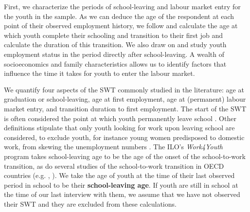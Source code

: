 \documentclass[
  a4paper, twoside, 12pt]{book}
\begin{document}
First, we characterize the periods of school-leaving and labour market entry for the youth in the sample. As we can deduce the age of the respondent at each point of their observed employment history, we follow \textcite{manacorda2017} and calculate the age at which youth complete their schooling and transition to their first job and calculate the duration of this transition. We also draw on \textcite{bridges2017} and study youth employment status in the period directly after school-leaving. A wealth of socioeconomics and family characteristics allows us to identify factors that influence the time it takes for youth to enter the labour market.

We quantify four aspects of the SWT commonly studied in the literature: age at graduation or school-leaving, age at first employment, age at (permanent) labour market entry, and transition duration to first employment. The start of the SWT is often considered the point at which youth permanently leave school \autocite{bowers1998,nilsson2019}. Other definitions stipulate that only youth looking for work upon leaving school are considered, to exclude youth, for instance young women predisposed to domestic work, from skewing the unemployment numbers \autocite{matsumoto2010}. The ILO's \emph{Work4Youth} program takes school-leaving age to be the age of the onset of the school-to-work transition, as do several studies of the school-to-work transition in OECD countries (e.g. \textcite{bowers1998}, \textcite{quintini2007}). We take the age of youth at the time of their last observed period in school to be their \textbf{school-leaving age}. If youth are still in school at the time of our last interview with them, we assume that we have not observed their SWT and they are excluded from these calculations.
\end{document}
